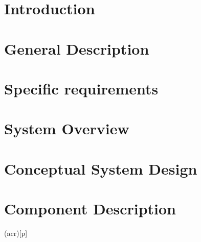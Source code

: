 \documentclass[a4paper,twoside,openright,makeidx,12pt]{book}
\begin{document}
\pagestyle{empty}
\renewcommand{\arraystretch}{1.8}



\tableofcontents


\pagestyle{fancy}
\cleardoublepage

\chapter{Introduction}
\label{Sec:SSD-Intoduction}


\newpage
\chapter{General Description}
\label{Sec:SSD-GeneralDescription}


\newpage
\chapter{Specific requirements}
\label{Sec:SSD-SpecificRequirements}





\newpage
\chapter{System Overview}
\label{Sec:SSD-SystemOverview}

\newpage
\chapter{Conceptual System Design}
\label{Sec:SSD-ConceptualSystemDesign}

\newpage
\chapter{Component Description}
\label{Sec:SSD-ComponentDescription}



\newpage
\printglosstex(acr)[p]


\listoffigures
\listoftables
\cleardoublepage
%
%
\cleardoublepage
\end{document}
